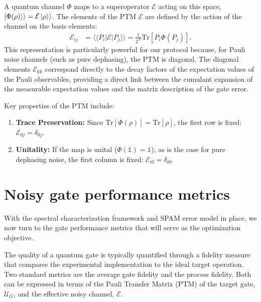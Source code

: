 \documentclass[%
 reprint,
superscriptaddress,
 amsmath,amssymb,
 aps,
pra,
floatfix,
]{revtex4-2}
\newcommand{\qk}[1]{{\color{OliveGreen}#1}}
\begin{document}
A quantum channel $\Phi$ maps to a superoperator $\mathcal{E}$ acting on this space, $\ket{\Phi(\rho)}\rangle=\mathcal{E}\ket{\rho}\rangle$. The elements of the PTM $\mathcal{E}$ are defined by the action of the channel on the basis elements:
\begin{align}
    \mathcal{E}_{ij} &= \langle\langle P_i | \mathcal{E} | P_j \rangle\rangle = \frac{1}{2^{N}}\text{Tr}\left[P_i \Phi(P_j)\right].
\end{align}
This representation is particularly powerful for our protocol because, for Pauli noise channels (such as pure dephasing), the PTM is diagonal. The diagonal elements $\mathcal{E}_{kk}$ correspond directly to the decay factors of the expectation values of the Pauli observables, providing a direct link between the cumulant expansion of the measurable expectation values and the matrix description of the gate error.

Key properties of the PTM include:
\begin{enumerate}
    \item \textbf{Trace Preservation:} Since $\text{Tr}[\Phi(\rho)] = \text{Tr}[\rho]$, the first row is fixed: $\mathcal{E}_{0j} = \delta_{0j}$.
    \item \textbf{Unitality:} If the map is unital ($\Phi(\mathbb{1}) = \mathbb{1}$), as is the case for pure dephasing noise, the first column is fixed: $\mathcal{E}_{i0} = \delta_{i0}$.
\end{enumerate}

\section{Noisy gate performance metrics}
\label{sec::metrics}

\qk{With the spectral characterization framework and SPAM error model in place, we now turn to the gate performance metrics that will serve as the optimization objective.}

The quality of a quantum gate is typically quantified through a fidelity measure that compares the experimental implementation to the ideal target operation. Two standard metrics are the average gate fidelity and the process fidelity. Both can be expressed in terms of the Pauli Transfer Matrix (PTM) of the target gate, $\mathcal{U}_G$, and the effective noisy channel, $\mathcal{E}$.
\end{document}

